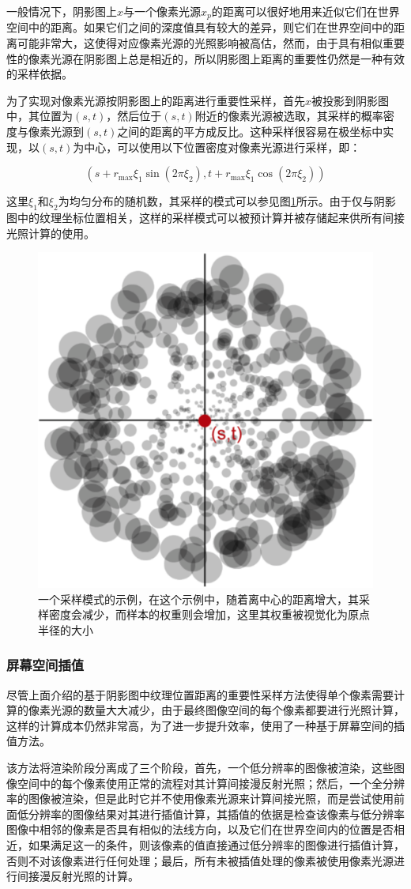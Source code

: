 一般情况下，阴影图上$x$与一个像素光源$x_p$的距离可以很好地用来近似它们在世界空间中的距离。如果它们之间的深度值具有较大的差异，则它们在世界空间中的距离可能非常大，这使得对应像素光源的光照影响被高估，然而，由于具有相似重要性的像素光源在阴影图上总是相近的，所以阴影图上距离的重要性仍然是一种有效的采样依据。

为了实现对像素光源按阴影图上的距离进行重要性采样，首先$x$被投影到阴影图中，其位置为$(s,t)$，然后位于$(s,t)$附近的像素光源被选取，其采样的概率密度与像素光源到$(s,t)$之间的距离的平方成反比。这种采样很容易在极坐标中实现，以$(s,t)$为中心，可以使用以下位置密度对像素光源进行采样，即：

\begin{equation}
	(s+r_{\max}\xi_1 \sin(2\pi \xi_2),t+r_{\max}\xi_1\cos(2\pi\xi_2))
\end{equation}

\noindent 这里$\xi_1$和$\xi_2$为均匀分布的随机数，其采样的模式可以参见图\ref{f:ir-rsm-sampling-pattern}所示。由于仅与阴影图中的纹理坐标位置相关，这样的采样模式可以被预计算并被存储起来供所有间接光照计算的使用。

\begin{figure}
\sidecaption
	\includegraphics[width=.35\textwidth]{figures/ir/ir-2-3}
	\caption{一个采样模式的示例，在这个示例中，随着离中心的距离增大，其采样密度会减少，而样本的权重则会增加，这里其权重被视觉化为原点半径的大小}
	\label{f:ir-rsm-sampling-pattern}
\end{figure} 




\subsubsection{屏幕空间插值}
尽管上面介绍的基于阴影图中纹理位置距离的重要性采样方法使得单个像素需要计算的像素光源的数量大大减少，由于最终图像空间的每个像素都要进行光照计算，这样的计算成本仍然非常高，为了进一步提升效率，\cite{a:ReflectiveShadowMaps}使用了一种基于屏幕空间的插值方法。

该方法将渲染阶段分离成了三个阶段，首先，一个低分辨率的图像被渲染，这些图像空间中的每个像素使用正常的流程对其计算间接漫反射光照；然后，一个全分辨率的图像被渲染，但是此时它并不使用像素光源来计算间接光照，而是尝试使用前面低分辨率的图像结果对其进行插值计算，其插值的依据是检查该像素与低分辨率图像中相邻的像素是否具有相似的法线方向，以及它们在世界空间内的位置是否相近，如果满足这一的条件，则该像素的值直接通过低分辨率的图像进行插值计算，否则不对该像素进行任何处理；最后，所有未被插值处理的像素被使用像素光源进行间接漫反射光照的计算。

